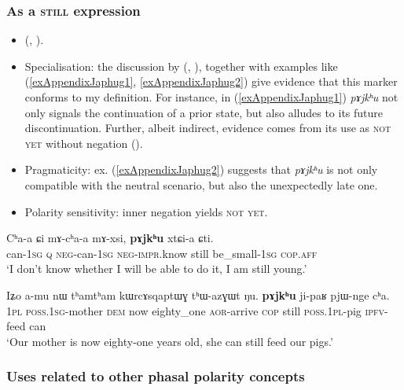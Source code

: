 \subsubsection{As a \textsc{still} expression}
\begin{itemize}
	\item \citeauthor{Jacques2016} (\citeyear[219]{Jacques2016}, \citeyear[1200–1201]{Jacques2021}).
	\item Specialisation: the discussion by \citeauthor{Jacques2016} (\citeyear[219]{Jacques2016}, \citeyear[1201]{Jacques2021}), together with examples like (\ref{exAppendixJaphug1}, \ref{exAppendixJaphug2}) give evidence that this marker conforms to my definition. For instance, in (\ref{exAppendixJaphug1}) \textit{{pɤjkʰu}} not only signals the continuation of a prior state, but also alludes to its future discontinuation. Further, albeit indirect, evidence comes from its use as \textsc{not yet} without negation ().
	\item Pragmaticity: ex. (\ref{exAppendixJaphug2}) suggests that \textit{pɤjkʰu} is not only compatible with the neutral scenario, but also the unexpectedly late one.
	\item Polarity sensitivity: inner negation yields \textsc{not yet}.
\end{itemize}
\begin{exe}
	\ex\label{exAppendixJaphug1}
	\gll Cʰa-a ɕi mɤ-cʰa-a mɤ-xsi, \textbf{pɤjkʰu} xtɕi-a ɕti.\\
	can-1\textsc{sg} \textsc{q} \textsc{neg}-can-1\textsc{sg} \textsc{neg}-\textsc{impr}.know still be\_small-1\textsc{sg} \textsc{cop}.\textsc{aff}\\
	\glt \lq I don’t know whether I will be able to do it, I am still young.\rq{ }\parencite[1172]{Jacques2021}

	\ex\label{exAppendixJaphug2}
	\gll Iʑo a-mu nɯ tʰamtʰam kɯrcɤsqaptɯɣ tʰɯ-azɣɯt ŋu. \textbf{pɤjkʰu} ji-paʁ pjɯ-nge cʰa.\\
	1\textsc{pl} \textsc{poss}.1\textsc{sg}-mother \textsc{dem} now eighty\_one \textsc{aor}-arrive \textsc{cop} still \textsc{poss}.1\textsc{pl}-pig \textsc{ipfv}-feed can\\
	\glt \lq Our mother is now eighty-one years old, she can still feed our pigs.' \parencite[1200]{Jacques2021}
\end{exe}

\subsubsection{Uses related to other phasal polarity concepts}
